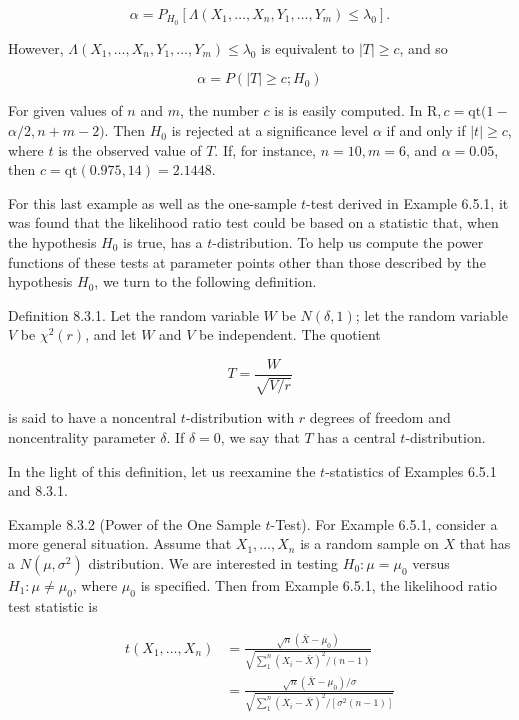 $$
\alpha=P_{H_{0}}\left[\Lambda\left(X_{1}, \ldots, X_{n}, Y_{1}, \ldots, Y_{m}\right) \leq \lambda_{0}\right] .
$$

However, $\Lambda\left(X_{1}, \ldots, X_{n}, Y_{1}, \ldots, Y_{m}\right) \leq \lambda_{0}$ is equivalent to $|T| \geq c$, and so

$$
\alpha=P\left(|T| \geq c ; H_{0}\right)
$$

For given values of $n$ and $m$, the number $c$ is is easily computed. In $\mathrm{R}, c=\mathrm{qt}(1-$ $\alpha / 2, n+m-2)$. Then $H_{0}$ is rejected at a significance level $\alpha$ if and only if $|t| \geq c$, where $t$ is the observed value of $T$. If, for instance, $n=10, m=6$, and $\alpha=0.05$, then $c=\mathrm{qt}(0.975,14)=2.1448$.

For this last example as well as the one-sample $t$-test derived in Example 6.5.1, it was found that the likelihood ratio test could be based on a statistic that, when the hypothesis $H_{0}$ is true, has a $t$-distribution. To help us compute the power functions of these tests at parameter points other than those described by the hypothesis $H_{0}$, we turn to the following definition.

Definition 8.3.1. Let the random variable $W$ be $N(\delta, 1)$; let the random variable $V$ be $\chi^{2}(r)$, and let $W$ and $V$ be independent. The quotient

$$
T=\frac{W}{\sqrt{V / r}}
$$

is said to have a noncentral $t$-distribution with $r$ degrees of freedom and noncentrality parameter $\delta$. If $\delta=0$, we say that $T$ has a central $t$-distribution.

In the light of this definition, let us reexamine the $t$-statistics of Examples 6.5.1 and 8.3.1.

Example 8.3.2 (Power of the One Sample $t$-Test). For Example 6.5.1, consider a more general situation. Assume that $X_{1}, \ldots, X_{n}$ is a random sample on $X$ that has a $N\left(\mu, \sigma^{2}\right)$ distribution. We are interested in testing $H_{0}: \mu=\mu_{0}$ versus $H_{1}: \mu \neq \mu_{0}$, where $\mu_{0}$ is specified. Then from Example 6.5.1, the likelihood ratio test statistic is

$$
\begin{aligned}
t\left(X_{1}, \ldots, X_{n}\right) & =\frac{\sqrt{n}\left(\bar{X}-\mu_{0}\right)}{\sqrt{\sum_{1}^{n}\left(X_{i}-\bar{X}\right)^{2} /(n-1)}} \\
& =\frac{\sqrt{n}\left(\bar{X}-\mu_{0}\right) / \sigma}{\sqrt{\sum_{1}^{n}\left(X_{i}-\bar{X}\right)^{2} /\left[\sigma^{2}(n-1)\right]}}
\end{aligned}
$$


